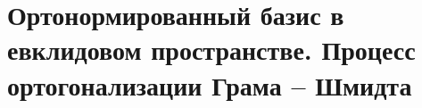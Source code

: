 \section{Ортонормированный базис в евклидовом пространстве. Процесс ортогонализации Грама – Шмидта}
